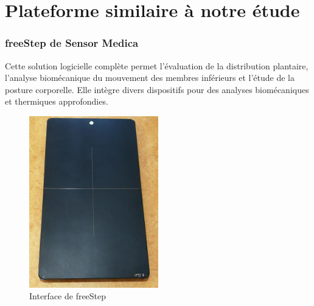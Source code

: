 \section{Plateforme similaire à notre étude}

\subsubsection{freeStep de Sensor Medica}
Cette solution logicielle complète permet l'évaluation de la distribution plantaire, l'analyse biomécanique du mouvement des membres inférieurs et l'étude de la posture corporelle. 
Elle intègre divers dispositifs pour des analyses biomécaniques et thermiques approfondies.

\begin{figure}[ht]
    \centering
    \includegraphics[width=0.5\textwidth]{images/freestep.png}
    \caption{Interface de freeStep}
    \label{fig:freestep}
\end{figure}